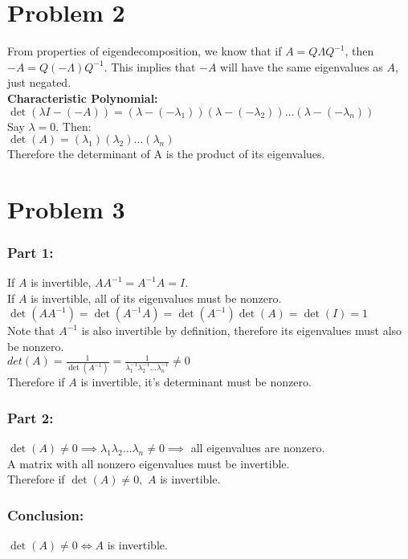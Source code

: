 \documentclass[fleqn]{article}
\begin{document}
\section*{Problem 2}
From properties of eigendecomposition, we know that if $A = Q \Lambda Q^{-1}$, then $-A = Q (-\Lambda)Q^{-1}$.  This implies that $-A$ will have the same eigenvalues as $A$, just negated.\\
\linebreak
\textbf{Characteristic Polynomial:}\\
\linebreak
$\det(\lambda I - (-A)) = (\lambda - (-\lambda_1))(\lambda - (-\lambda_2))\dots(\lambda - (-\lambda_n))$\\
Say $\lambda = 0$.  Then: \\
$\det(A) = (\lambda_1)(\lambda_2)\dots(\lambda_n)$\\
Therefore the determinant of A is the product of its eigenvalues.
\section*{Problem 3}
\subsubsection*{Part 1:}
If $A$ is invertible, $AA^{-1}=A^{-1}A=I$.\\
If $A$ is invertible, all of its eigenvalues must be nonzero. \\
$\det(AA^{-1})=\det(A^{-1}A)=\det(A^{-1})\det(A)=\det(I)=1$\\
Note that $A^{-1}$ is also invertible by definition, therefore its eigenvalues must also be nonzero.\\
$det(A)=\frac{1}{\det(A^{-1})}=\frac{1}{\lambda^{-1}_1\lambda^{-1}_2\dots \lambda^{-1}_n} \neq 0$\\
\linebreak
Therefore if $A$ is invertible, it's determinant must be nonzero.
\subsubsection*{Part 2: }
$\det(A) \neq 0 \implies \lambda_1\lambda_2\dots\lambda_n \neq 0 \implies $ all eigenvalues are nonzero.\\
A matrix with all nonzero eigenvalues must be invertible.\\ 
\linebreak
Therefore if $\det(A) \neq 0,$ $A$ is invertible.
\subsubsection*{Conclusion: }
$\det(A) \neq 0 \iff A$ is invertible.

\end{document}
